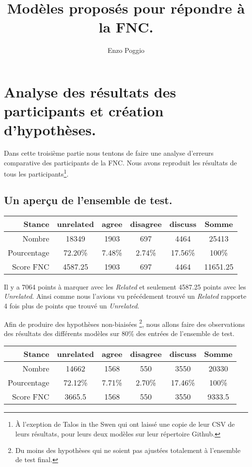 \documentclass[onecolumn, 12pt]{article}
\title{Modèles proposés pour répondre à la FNC.}
\author{Enzo Poggio}
\begin{document}
\maketitle{}



\section{Analyse des résultats des participants et création d'hypothèses.}
Dans cette troisième partie nous tentons de faire une analyse d'erreurs
comparative des participants de la FNC. Nous avons reproduit les résultats de
tous les participants\footnote{À l'exeption de Talos in the Swen qui ont laissé
 une copie de leur CSV de leurs résultats, pour leurs deux modèles sur leur
 répertoire Github.}.
\subsection{Un aperçu de l'ensemble de test.}
\begin{center}

 \begin{tabular}{ r | c c c c | c}
  Stance      & unrelated & agree  & disagree & discuss &          
  Somme                                                            \\
  \hline
  Nombre      & 18349     & 1903   & 697      & 4464    & 25413    \\
  Pourcentage & 72.20\%   & 7.48\% & 2.74\%   & 17.56\% & 100\%    \\
  Score FNC   & 4587.25   & 1903   & 697      & 4464    & 11651.25 \\
 \end{tabular}
\end{center}

Il y a 7064 points à marquer avec les \textit{Related} et seulement 4587.25 points avec les \textit{Unrelated}.
Ainsi comme nous l'avions vu précédement trouvé un \textit{Related} rapporte 4 fois plus de points que trouvé un \textit{Unrelated}.

Afin de produire des hypothèses non-biaisées  \footnote{Du moins des hypothèses qui ne soient pas ajustées totalement à l'ensemble de test final.}, nous allons faire des observations des résultats des différents modèles sur 80\% des entrées de l'ensemble de test.

\begin{center}
 \begin{tabular}{ r | c c c c | c}
  Stance      & unrelated & agree  & disagree & discuss &        
  Somme                                                          \\
  \hline
  Nombre      & 14662     & 1568   & 550      & 3550    & 20330  \\
  Pourcentage & 72.12\%   & 7.71\% & 2.70\%   & 17.46\% & 100\%  \\
  Score FNC   & 3665.5    & 1568   & 550      & 3550    & 9333.5 \\
 \end{tabular}
\end{center}
\end{document}
